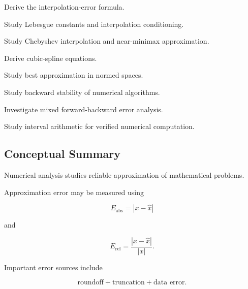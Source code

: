 \begin{exercise}[4]
Derive the interpolation-error formula.
\end{exercise}

\begin{exercise}[4]
Study Lebesgue constants and interpolation conditioning.
\end{exercise}

\begin{exercise}[4]
Study Chebyshev interpolation and near-minimax approximation.
\end{exercise}

\begin{exercise}[4]
Derive cubic-spline equations.
\end{exercise}

\begin{exercise}[4]
Study best approximation in normed spaces.
\end{exercise}

\begin{exercise}[4]
Study backward stability of numerical algorithms.
\end{exercise}

\begin{exercise}[4]
Investigate mixed forward-backward error analysis.
\end{exercise}

\begin{exercise}[4]
Study interval arithmetic for verified numerical computation.
\end{exercise}

\subsection{Conceptual Summary}
\label{subsec:numerical-analysis-summary}

Numerical analysis studies reliable approximation of mathematical
problems.

Approximation error may be measured using

\[
\boxed{
E_{\mathrm{abs}}
=
|x-\widehat{x}|
}
\]

and

\[
\boxed{
E_{\mathrm{rel}}
=
\frac{
|x-\widehat{x}|
}{
|x|
}.
}
\]

Important error sources include

\[
\boxed{
\text{roundoff}
+
\text{truncation}
+
\text{data error}.
}
\]

